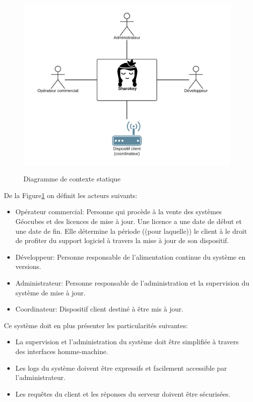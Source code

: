 \documentclass{themeensg}
\begin{document}
\begin{figure}[h!]
\includegraphics[scale=0.9]{images/context_general.png}
\label{fig:context_statique}
\centering
\caption{Diagramme de contexte statique}
\end{figure}

De la Figure\ref{fig:context_statique} on définit les acteurs suivants:
\begin{itemize}
\item Opérateur commercial: Personne qui procède à la vente des systèmes Géocubes et des licences de mise à jour. Une licence a une date de début et une date de fin. Elle détermine la période ((pour laquelle)) le client à le droit de profiter du support logiciel à travers la mise à jour de son dispositif.
\item Développeur: Personne responsable de l'alimentation continue du système en versions.
\item Administrateur: Personne responsable de l'administration et la supervision du système de mise à jour.
\item Coordinateur: Dispositif client destiné à être mis à jour.
\end{itemize}

Ce système doit en plus présenter les particularités suivantes:
\begin{itemize}
\item La supervision et l'administration du système doit être simplifiée à travers des interfaces homme-machine.
\item Les logs du système doivent être expressifs et facilement accessible par l'administrateur.
\item Les requêtes du client et les réponses du serveur doivent être sécurisées.
\end{itemize}
\end{document}
